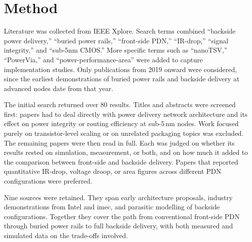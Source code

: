 \section{Method}

Literature was collected from IEEE Xplore. Search terms combined ``backside power delivery,'' ``buried power rails,'' ``front-side PDN,'' ``IR-drop,'' ``signal integrity,'' and ``sub-5nm CMOS.'' More specific terms such as ``nanoTSV,'' ``PowerVia,'' and ``power-performance-area'' were added to capture implementation studies. Only publications from 2019 onward were considered, since the earliest demonstrations of buried power rails and backside delivery at advanced nodes date from that year.

The initial search returned over 80 results. Titles and abstracts were screened first: papers had to deal directly with power delivery network architecture and its effect on power integrity or routing efficiency at sub-5\,nm nodes. Work focused purely on transistor-level scaling or on unrelated packaging topics was excluded. The remaining papers were then read in full. Each was judged on whether its results rested on simulation, measurement, or both, and on how much it added to the comparison between front-side and backside delivery. Papers that reported quantitative IR-drop, voltage droop, or area figures across different PDN configurations were preferred.

Nine sources were retained. They span early architecture proposals, industry demonstrations from Intel and imec, and parasitic modelling of backside configurations. Together they cover the path from conventional front-side PDN through buried power rails to full backside delivery, with both measured and simulated data on the trade-offs involved.
